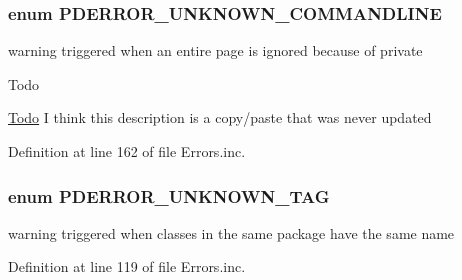 \hypertarget{_errors_8inc_a8cad5c4b948c81f81e8abfe85a5ea31e}{
\subsubsection[{\-P\-D\-E\-R\-R\-O\-R\-\_\-\-U\-N\-K\-N\-O\-W\-N\-\_\-\-C\-O\-M\-M\-A\-N\-D\-L\-I\-N\-E}]{\setlength{\rightskip}{0pt plus 5cm}enum {\bf \-P\-D\-E\-R\-R\-O\-R\-\_\-\-U\-N\-K\-N\-O\-W\-N\-\_\-\-C\-O\-M\-M\-A\-N\-D\-L\-I\-N\-E}}}\label{_errors_8inc_a8cad5c4b948c81f81e8abfe85a5ea31e}
warning triggered when an entire page is ignored because of  private \begin{DoxyRefDesc}{\-Todo}
\item[\hyperlink{todo__todo000080}{\-Todo}]\-I think this description is a copy/paste that was never updated \end{DoxyRefDesc}


\-Definition at line 162 of file \-Errors.\-inc.

\hypertarget{_errors_8inc_ab06a40802e99f189d391eb08c7f95f4d}{
\subsubsection[{\-P\-D\-E\-R\-R\-O\-R\-\_\-\-U\-N\-K\-N\-O\-W\-N\-\_\-\-T\-A\-G}]{\setlength{\rightskip}{0pt plus 5cm}enum {\bf \-P\-D\-E\-R\-R\-O\-R\-\_\-\-U\-N\-K\-N\-O\-W\-N\-\_\-\-T\-A\-G}}}\label{_errors_8inc_ab06a40802e99f189d391eb08c7f95f4d}
warning triggered when classes in the same package have the same name 

\-Definition at line 119 of file \-Errors.\-inc.

